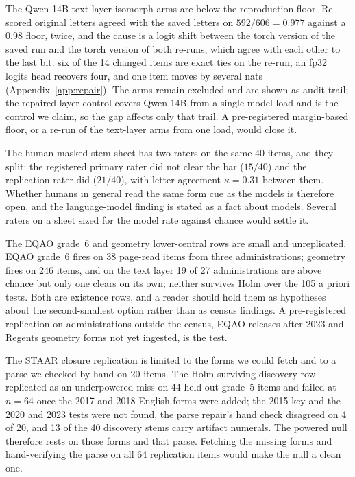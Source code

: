 The Qwen 14B text-layer isomorph arms are below the reproduction floor. Re-scored original letters agreed with the saved letters on $592/606=0.977$ against a $0.98$ floor, twice, and the cause is a logit shift between the torch version of the saved run and the torch version of both re-runs, which agree with each other to the last bit: six of the 14 changed items are exact ties on the re-run, an fp32 logits head recovers four, and one item moves by several nats (Appendix~\ref{app:repair}). The arms remain excluded and are shown as audit trail; the repaired-layer control covers Qwen 14B from a single model load and is the control we claim, so the gap affects only that trail. A pre-registered margin-based floor, or a re-run of the text-layer arms from one load, would close it.

The human masked-stem sheet has two raters on the same 40 items, and they split: the registered primary rater did not clear the bar ($15/40$) and the replication rater did ($21/40$), with letter agreement $\kappa=0.31$ between them. Whether humans in general read the same form cue as the models is therefore open, and the language-model finding is stated as a fact about models. Several raters on a sheet sized for the model rate against chance would settle it.

The EQAO grade~6 and geometry lower-central rows are small and unreplicated. EQAO grade~6 fires on 38 page-read items from three administrations; geometry fires on 246 items, and on the text layer 19 of 27 administrations are above chance but only one clears on its own; neither survives Holm over the 105 a priori tests. Both are existence rows, and a reader should hold them as hypotheses about the second-smallest option rather than as census findings. A pre-registered replication on administrations outside the census, EQAO releases after 2023 and Regents geometry forms not yet ingested, is the test.

The STAAR closure replication is limited to the forms we could fetch and to a parse we checked by hand on 20 items. The Holm-surviving discovery row replicated as an underpowered miss on 44 held-out grade~5 items and failed at $n=64$ once the 2017 and 2018 English forms were added; the 2015 key and the 2020 and 2023 tests were not found, the parse repair's hand check disagreed on 4 of 20, and 13 of the 40 discovery stems carry artifact numerals. The powered null therefore rests on those forms and that parse. Fetching the missing forms and hand-verifying the parse on all 64 replication items would make the null a clean one.

